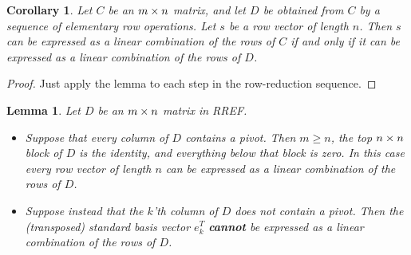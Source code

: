 \documentclass[reqno]{amsart}
\newtheorem{lemma}[theorem]{Lemma}
\newtheorem{corollary}[theorem]{Corollary}
\theoremstyle{definition}
\begin{document}
\begin{corollary}\label{cor-span-invariant}
 Let $C$ be an $m\times n$ matrix, and let $D$ be obtained from $C$ by a
 sequence of elementary row operations.  Let $s$ be a row vector of length
 $n$.  Then $s$ can be expressed as a linear combination of the rows
 of $C$ if and only if it can be expressed as a linear combination of
 the rows of $D$.
\end{corollary}
\begin{proof}
 Just apply the lemma to each step in the row-reduction sequence.
\end{proof}

\begin{lemma}\label{lem-check-span-RREF}
 Let $D$ be an $m\times n$ matrix in RREF.
 \begin{itemize}
  \item[(a)] Suppose that every column of $D$ contains a pivot.  Then
   $m\geq n$, the top $n\times n$ block of $D$ is the identity,  and
   everything below that block is zero.  In this case every row vector
   of length $n$ can be expressed as a linear combination of the rows
   of $D$.
  \item[(b)] Suppose instead that the $k$'th column of $D$ does not contain
   a pivot.  Then the (transposed) standard basis vector $e_k^T$
   \textbf{cannot} be expressed as a linear combination of the rows of $D$.
 \end{itemize}
\end{lemma}
\end{document}
